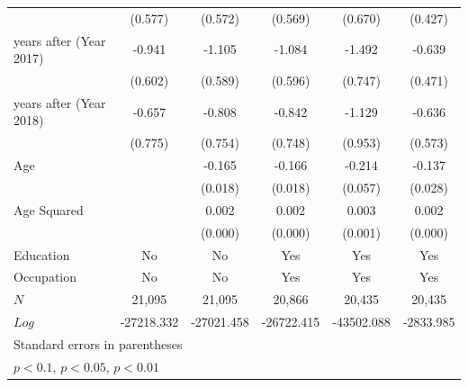 \documentclass[a4paper,12pt]{article}
\begin{document}
\begin{table}[htbp]
{\begin{tabular}{@{\extracolsep{5pt}}lccccc}
            &     (0.577)         &     (0.572)         &     (0.569)         &     (0.670)         &     (0.427)         \\
\addlinespace
6 years after (Year 2017)&      -0.941         &      -1.105\sym{*}  &      -1.084\sym{*}  &      -1.492\sym{**} &      -0.639         \\
            &     (0.602)         &     (0.589)         &     (0.596)         &     (0.747)         &     (0.471)         \\
\addlinespace
7 years after (Year 2018)&      -0.657         &      -0.808         &      -0.842         &      -1.129         &      -0.636         \\
            &     (0.775)         &     (0.754)         &     (0.748)         &     (0.953)         &     (0.573)         \\
\addlinespace
Age         &                     &      -0.165\sym{***}&      -0.166\sym{***}&      -0.214\sym{***}&      -0.137\sym{***}\\
            &                     &     (0.018)         &     (0.018)         &     (0.057)         &     (0.028)         \\
\addlinespace
Age Squared &                     &       0.002\sym{***}&       0.002\sym{***}&       0.003\sym{***}&       0.002\sym{***}\\
            &                     &     (0.000)         &     (0.000)         &     (0.001)         &     (0.000)         \\
\midrule
Education   &          No         &          No         &         Yes         &         Yes         &         Yes         \\
Occupation  &          No         &          No         &         Yes         &         Yes         &         Yes         \\
$\textit{N}$&      21,095         &      21,095         &      20,866         &      20,435         &      20,435         \\
$\textit{Log Pseudolikelihood}$&  -27218.332         &  -27021.458         &  -26722.415         &  -43502.088         &   -2833.985         \\
\bottomrule
\multicolumn{6}{l}{\footnotesize Standard errors in parentheses}\\
\multicolumn{6}{l}{\footnotesize \sym{*} \(p<0.1\), \sym{**} \(p<0.05\), \sym{***} \(p<0.01\)}\\

\end{tabular}}
\end{table}
\end{document}
